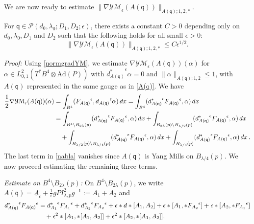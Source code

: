 \documentclass[11pt]{article}
\numberwithin{equation}{section} \setlength{\topmargin}{-35pt}
\newcommand{\PP}{\mathcal{P}}
\newcommand{\Ad}{\text{Ad}}
\newcommand{\YMe}{\mathcal{YM}_{\epsilon}}
\newcommand{\q}{\mathsf{q}}
\begin{document}
We are now ready to estimate
$\|\nabla\YMe(A(\q))\|_{A(\q);1,2,\ast}$.
\begin{lemma}
 \label{L3.1} For $\q\in\PP(d_0,\lambda_0;D_1,D_2;\epsilon)$, there exists a constant $C>0$ depending only on $d_0,\lambda_0,D_1$
 and $D_2$ such that the following holds for all small $\epsilon>0$:
$$\|\nabla\YMe(A(\q))\|_{A(\q);1,2,\ast}\le C\epsilon^{1/2}.$$
\end{lemma}
\textit{Proof:} Using \eqref{normgradYM}, we estimate
$\nabla\YMe(A(\q))(\alpha)$ for $\alpha\in
L^2_{0,1}(T^{\ast}B^4\otimes\Ad(P))$ with
${d_{A(\q)}^{\ast}}^{\epsilon}\alpha=0$ and
$\|\alpha\|_{A(\q);1,2}\le 1$, with $A(\q)$ represented in the same
gauge as in \eqref{A(q)}. We have
\begin{align}
\label{nabla}
\frac{1}{2}\nabla\YMe(A(\q))(\alpha)&=\int_{B^4}({F_{A(\q)}}^{\epsilon},{d_{A(\q)}}^{\epsilon}\alpha)\,dx
=\int_{B^4}({d_{A(\q)}^{\ast}}^{\epsilon}{F_{A(\q)}}^{\epsilon},\alpha)\,dx\notag\\
&=\int_{B^4\setminus
B_{2\lambda}(p)}({d_{A(\q)}^{\ast}}^{\epsilon}{F_{A(\q)}}^{\epsilon},\alpha)\,dx+
\int_{B_{2\lambda}(p)\setminus B_{\lambda/2}(p)}({d_{A(\q)}^{\ast}}^{\epsilon}{F_{A(\q)}}^{\epsilon},\alpha)\,dx\notag\\
&\quad+\int_{B_{\lambda/2}(p)\setminus
B_{\lambda/4}(p)}({d_{A(\q)}^{\ast}}^{\epsilon}{F_{A(\q)}}^{\epsilon},\alpha)\,dx
+\int_{B_{\lambda/4}(p)}({d_{A(\q)}^{\ast}}^{\epsilon}{F_{A(\q)}}^{\epsilon},\alpha)\,dx\,.
\end{align}
The last term in \eqref{nabla} vanishes since $A(\q)$ is Yang Mills
on $B_{\lambda/4}(p)$. We now proceed estimating the remaining three
terms.

\textit{Estimate on $B^4\setminus B_{2\lambda}(p)$:} On
$B^4\setminus B_{2\lambda}(p)$, we write
$A(\q)=\underline{A}_{\epsilon}+\frac{1}{\epsilon}gPI^2_{\lambda,p}g^{-1}:=A_1+A_2$
and
\begin{align}
\label{est1}
{d_{A(\q)}^{\ast}}^{\epsilon}{F_{A(\q)}}^{\epsilon}&={d_{A_1}^{\ast}}^{\epsilon}{F_{A_1}}^{\epsilon}+{d_{A_2}^{\ast}}^{\epsilon}{F_{A_2}}^{\epsilon}+\epsilon\ast
d\ast[A_1,A_2]+\epsilon\ast[A_1,\ast {F_{A_2}}^{\epsilon}]+
\epsilon\ast[A_2,\ast {F_{A_1}}^{\epsilon}]\notag\\
 &\quad+\epsilon^2\ast[A_1,\ast[A_1,A_2]]+\epsilon^2\ast[A_2,\ast[A_1,A_2]].
\end{align}
\end{document}
